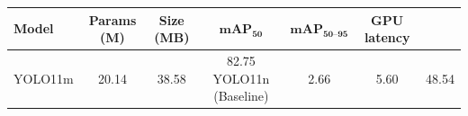 \begin{tabular}{|l|c|c|c|c|c|}
\hline
\textbf{Model} & \textbf{Params (M)} & \textbf{Size (MB)} & $\boldsymbol{mAP_{50}}$ & $\boldsymbol{mAP_{50\text{--}95}}$ & \textbf{GPU latency} \\
\hline \hline
YOLO11m & 20.14 & 38.58 & 82.75%
\hline
YOLO11n (Baseline) & 2.66 & 5.60 & 48.54%
\hline
\end{tabular}
